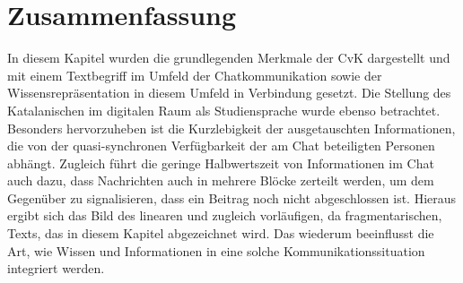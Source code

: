\section{Zusammenfassung}
\label{K2:sec:Zusammenfassung}


In diesem Kapitel wurden die grundlegenden Merkmale der CvK dargestellt und mit einem Textbegriff im Umfeld der Chatkommunikation sowie der Wissensrepräsentation in diesem Umfeld in Verbindung gesetzt. Die Stellung des Katalanischen im digitalen Raum als Studiensprache wurde ebenso betrachtet. Besonders hervorzuheben ist die Kurzlebigkeit der ausgetauschten Informationen, die von der quasi-synchronen Verfügbarkeit der am Chat beteiligten Personen abhängt. Zugleich führt die geringe Halbwertszeit von Informationen im Chat auch dazu, dass Nachrichten auch in mehrere Blöcke zerteilt werden, um dem Gegenüber zu signalisieren, dass ein Beitrag noch nicht abgeschlossen ist. Hieraus ergibt sich das Bild des linearen und zugleich vorläufigen, da fragmentarischen, Texts, das in diesem Kapitel abgezeichnet wird. Das wiederum beeinflusst die Art, wie Wissen und Informationen in eine solche Kommunikationssituation integriert werden.


